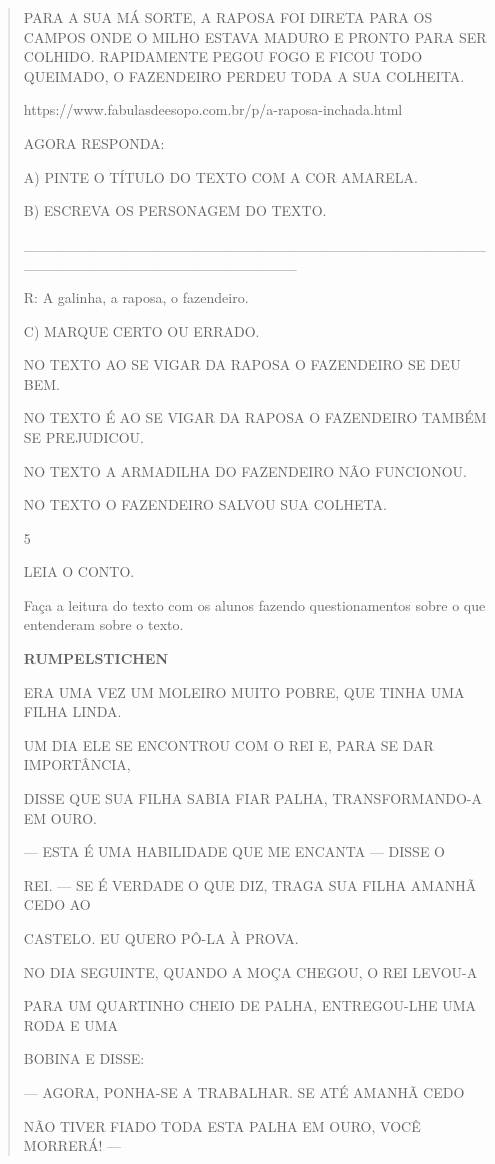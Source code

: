 {{{{\begin{verse}
{{\begin{escolha}
{{{{PARA A SUA MÁ SORTE, A RAPOSA FOI DIRETA PARA OS CAMPOS ONDE O MILHO
ESTAVA MADURO E PRONTO PARA SER COLHIDO. RAPIDAMENTE PEGOU FOGO E FICOU
TODO QUEIMADO, O FAZENDEIRO PERDEU TODA A SUA COLHEITA.

https://www.fabulasdeesopo.com.br/p/a-raposa-inchada.html

AGORA RESPONDA:

A) PINTE O TÍTULO DO TEXTO COM A COR AMARELA.

B) ESCREVA OS PERSONAGEM DO TEXTO.

\_\_\_\_\_\_\_\_\_\_\_\_\_\_\_\_\_\_\_\_\_\_\_\_\_\_\_\_\_\_\_\_\_\_\_\_\_\_\_\_\_\_\_\_\_\_\_\_\_\_\_\_\_\_\_\_\_\_\_\_\_\_\_\_\_\_\_\_\_\_

R: A galinha, a raposa, o fazendeiro.

C) MARQUE CERTO OU ERRADO.

NO TEXTO AO SE VIGAR DA RAPOSA O FAZENDEIRO SE DEU BEM.

NO TEXTO É AO SE VIGAR DA RAPOSA O FAZENDEIRO TAMBÉM SE PREJUDICOU.

NO TEXTO A ARMADILHA DO FAZENDEIRO NÃO FUNCIONOU.

NO TEXTO O FAZENDEIRO SALVOU SUA COLHETA.

\num{5}

LEIA O CONTO.

Faça a leitura do texto com os alunos fazendo questionamentos sobre o
que entenderam sobre o texto.

\textbf{RUMPELSTICHEN}

ERA UMA VEZ UM MOLEIRO MUITO POBRE, QUE TINHA UMA FILHA LINDA.

UM DIA ELE SE ENCONTROU COM O REI E, PARA SE DAR IMPORTÂNCIA,

DISSE QUE SUA FILHA SABIA FIAR PALHA, TRANSFORMANDO-A EM OURO.

--- ESTA É UMA HABILIDADE QUE ME ENCANTA --- DISSE O

REI. --- SE É VERDADE O QUE DIZ, TRAGA SUA FILHA AMANHÃ CEDO AO

CASTELO. EU QUERO PÔ-LA À PROVA.

NO DIA SEGUINTE, QUANDO A MOÇA CHEGOU, O REI LEVOU-A

PARA UM QUARTINHO CHEIO DE PALHA, ENTREGOU-LHE UMA RODA E UMA

BOBINA E DISSE:

--- AGORA, PONHA-SE A TRABALHAR. SE ATÉ AMANHÃ CEDO

NÃO TIVER FIADO TODA ESTA PALHA EM OURO, VOCÊ MORRERÁ! ---

}}}}
\end{escolha}}}
\end{verse}}}}}
